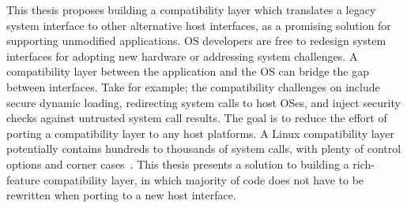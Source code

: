 This thesis proposes building a compatibility layer
which translates
a legacy system interface to other alternative host interfaces, as a promising solution for supporting unmodified applications.
OS developers are free to redesign
system interfaces
for adopting new hardware or addressing system challenges.
A compatibility layer between the application and the OS
can bridge the gap between interfaces.
Take \sgx{} for example;
the compatibility challenges on \sgx{} include
secure dynamic loading,
redirecting system calls to host OSes, and inject security checks against untrusted system call results.
The goal is to reduce the effort of porting a compatibility layer
to any host platforms.
A Linux compatibility layer
potentially contains
hundreds to thousands of system calls, with plenty of control options and corner cases~\cite{linux-man-syscall}.
This thesis presents a solution
to building a rich-feature compatibility layer, in which
majority of code does not have to be rewritten when porting to a new host interface.









